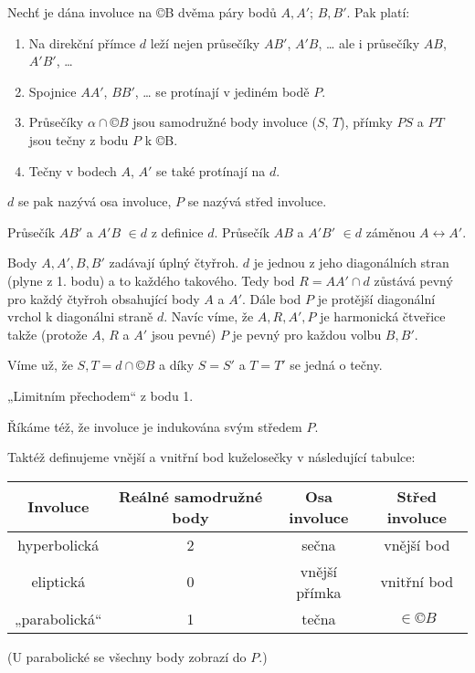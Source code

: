 \documentclass[12pt]{article}					%
\begin{document}
\begin{veta}
	Nechť je dána involuce na ©B dvěma páry bodů $A, A'$; $B, B'$. Pak platí:
	\begin{enumerate}
		\item Na direkční přímce $d$ leží nejen průsečíky $AB'$, $A'B$, … ale i průsečíky $AB$, $A'B'$, …
		\item Spojnice $AA'$, $BB'$, … se protínají v jediném bodě $P$.
		\item Průsečíky $α \cap ©B$ jsou samodružné body involuce ($S$, $T$), přímky $PS$ a $PT$ jsou tečny z bodu $P$ k ©B.
		\item Tečny v bodech $A$, $A'$ se také protínají na $d$.
	\end{enumerate}

	\begin{definicein}
		$d$ se pak nazývá osa involuce, $P$ se nazývá střed involuce.
	\end{definicein}

	\begin{dukazin}[1.]
		Průsečík $AB'$ a $A'B$ $\in d$ z definice $d$. Průsečík $AB$ a $A'B'$ $\in d$ záměnou $A \leftrightarrow A'$.
	\end{dukazin}

	\begin{dukazin}[2.]
		Body $A, A', B, B'$ zadávají úplný čtyřroh. $d$ je jednou z jeho diagonálních stran (plyne z 1. bodu) a to každého takového. Tedy bod $R = AA' \cap d$ zůstává pevný pro každý čtyřroh obsahující body $A$ a $A'$. Dále bod $P$ je protější diagonální vrchol k diagonálni straně $d$. Navíc víme, že $A, R, A', P$ je harmonická čtveřice takže (protože $A$, $R$ a $A'$ jsou pevné) $P$ je pevný pro každou volbu $B, B'$.
	\end{dukazin}

	\begin{dukazin}[3.]
		Víme už, že $S, T = d \cap ©B$ a díky $S = S'$ a $T = T'$ se jedná o tečny.
	\end{dukazin}

	\begin{dukazin}[4.]
		„Limitním přechodem“ z bodu 1.
	\end{dukazin}
\end{veta}

\begin{definice}
	Říkáme též, že involuce je indukována svým středem $P$.

	Taktéž definujeme vnější a vnitřní bod kuželosečky v následující tabulce:

	\begin{tabular}{c|ccc}
		Involuce      & Reálné samodružné body & Osa involuce  & Střed involuce \\ \hline
		hyperbolická  & 2                      & sečna         & vnější bod     \\
		eliptická     & 0                      & vnější přímka & vnitřní bod    \\
		„parabolická“ & 1                      & tečna         & $\in ©B$
	\end{tabular}

	(U parabolické se všechny body zobrazí do $P$.)
\end{definice}
\end{document}
